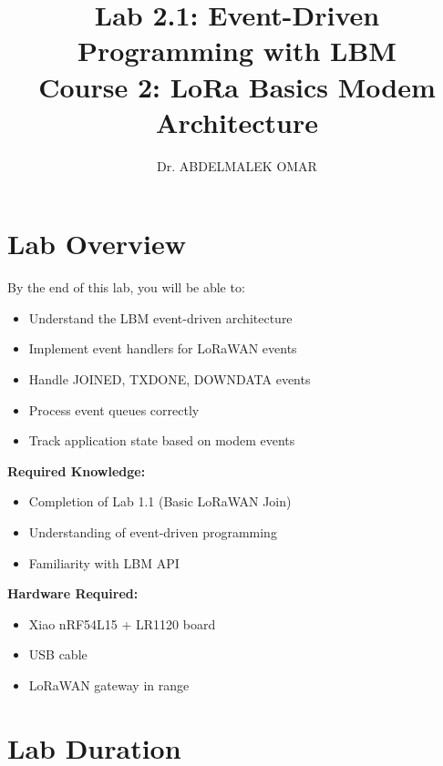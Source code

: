 \documentclass[11pt,a4paper]{article}
\title{
    \textbf{Lab 2.1: Event-Driven Programming with LBM}\\
    \large Course 2: LoRa Basics Modem Architecture
}
\author{Dr. ABDELMALEK OMAR}
\date{}
\begin{document}
\mailtitle
\thispagestyle{fancy}

\section{Lab Overview}

\begin{objectivebox}
By the end of this lab, you will be able to:
\begin{itemize}
    \item Understand the LBM event-driven architecture
    \item Implement event handlers for LoRaWAN events
    \item Handle JOINED, TXDONE, DOWNDATA events
    \item Process event queues correctly
    \item Track application state based on modem events
\end{itemize}
\end{objectivebox}

\vspace{0.5cm}

\begin{prereqbox}
\textbf{Required Knowledge:}
\begin{itemize}
    \item Completion of Lab 1.1 (Basic LoRaWAN Join)
    \item Understanding of event-driven programming
    \item Familiarity with LBM API
\end{itemize}

\vspace{0.3cm}

\textbf{Hardware Required:}
\begin{itemize}
    \item Xiao nRF54L15 + LR1120 board
    \item USB cable
    \item LoRaWAN gateway in range
\end{itemize}
\end{prereqbox}

\section{Lab Duration}
\end{document}
